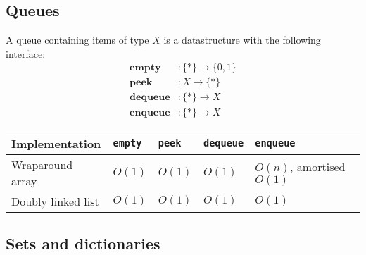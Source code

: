\documentclass{article}
\begin{document}
\subsection{Queues}

\begin{definition}
	A queue containing items of type $X$ is a datastructure with
	the following interface:
	\begin{align*}
		\textbf{empty}   & : \{*\}\to\{0, 1\} \\
		\textbf{peek}    & : X \to \{*\}      \\
		\textbf{dequeue} & : \{*\}\to X       \\
		\textbf{enqueue} & : \{*\}\to X
	\end{align*}
\end{definition}

\begin{center}
	\begin{tabular}{ l | l | l | l | l}
		\textbf{Implementation}
		 & \texttt{empty}
		 & \texttt{peek}
		 & \texttt{dequeue}
		 & \texttt{enqueue}
		\\
		\hline
		Wraparound array
		 & $O(1)$
		 & $O(1)$
		 & $O(1)$
		 & $O(n)$, amortised $O(1)$
		\\
		\hline
		Doubly linked list
		 & $O(1)$
		 & $O(1)$
		 & $O(1)$
		 & $O(1)$
	\end{tabular}
\end{center}

\subsection{Sets and dictionaries}
\end{document}
